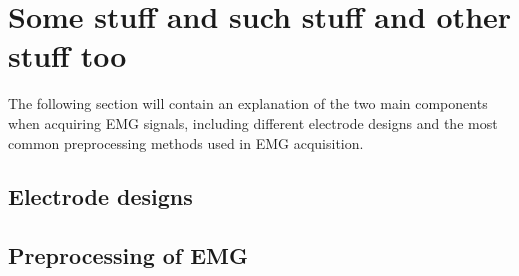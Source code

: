 \section{Some stuff and such stuff and other stuff too}

The following section will contain an explanation of the two main components when acquiring EMG signals, including different electrode designs and the most common preprocessing methods used in EMG acquisition.


\subsection{Electrode designs}






\subsection{Preprocessing of EMG}

